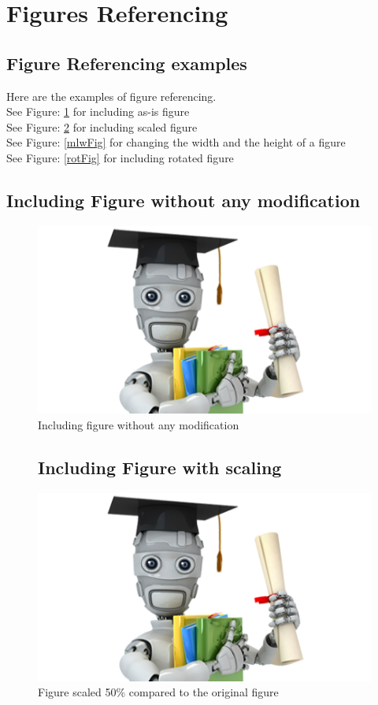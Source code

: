 \section{Figures Referencing}

\subsection{Figure Referencing examples}
Here are the examples of figure referencing. \\
See Figure: \ref{unmodfig} for including as-is figure \\
See Figure: \ref{scaledFig} for including scaled figure \\
See Figure: \ref{mlwFig} for changing the width and the height of 
a figure \\
See Figure: \ref{rotFig} for including rotated figure \\



\subsection{Including Figure without any modification}
\begin{figure}[!htbp]
\includegraphics{"machineLearning"}
\caption[Unmodified Figure]{Including figure without any modification}
\label{unmodfig}
\end{figure}

\begin{figure}[!htbp]
\subsection{Including Figure with scaling}
\includegraphics[scale = 0.5]{"machineLearning"}
\caption[Scaled Figure]{Figure scaled 50\% compared to the original figure}
\label{scaledFig}
\end{figure}

